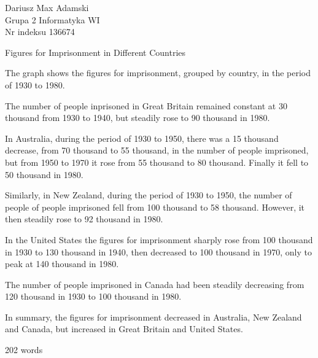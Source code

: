 \documentclass[12pt]{article}
\begin{document}

\begin{flushleft} 
	Dariusz Max Adamski \\
	Grupa 2 Informatyka WI\\
	Nr indeksu 136674
\end{flushleft}

\begin{center} 
	\vspace{0.8cm} \Large
	Figures for Imprisonment in Different Countries
	\vspace{0.5cm}
\end{center}

The graph shows the figures for imprisonment, grouped by country, in the period of 1930 to 1980.

The number of people inprisoned in Great Britain remained constant at 30 thousand from 1930 to 1940, but steadily rose to 90 thousand in 1980.

In Australia, during the period of 1930 to 1950, there was a 15 thousand decrease, from 70 thousand to 55 thousand, in the number of people imprisoned, but from 1950 to 1970 it rose from 55 thousand to 80 thousand. Finally it fell to 50 thousand in 1980.

Similarly, in New Zealand, during the period of 1930 to 1950, the number of people of people imprisoned fell from 100 thousand to 58 thousand. However, it then steadily rose to 92 thousand in 1980.

In the United States the figures for imprisonment sharply rose from 100 thousand in 1930 to 130 thousand in 1940, then decreased to 100 thousand in 1970, only to peak at 140 thousand in 1980.

The number of people imprisoned in Canada had been steadily decreasing from 120 thousand in 1930 to 100 thousand in 1980.

In summary, the figures for imprisonment decreased in Australia, New Zealand and Canada, but increased in Great Britain and United States.

202 words
\end{document}
